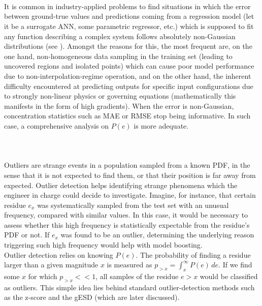 \paragraph{ \\}
It is common in industry-applied problems to find situations in which the error between ground-true values and predictions coming from a regression model (let it be a surrogate ANN, some parametric regressor, etc.) which is supposed to fit any function describing a complex system follows absolutely non-Gaussian distributions (see \eg \cite{chen2003non,pernot2020impact,smyl2021learning,chai2019using}). Amongst the reasons for this, the most frequent are, on the one hand, non-homogeneous data sampling in the training set (leading to uncovered regions and isolated points) which can cause poor model performance due to non-interpolation-regime operation, and on the other hand, the inherent difficulty encountered at predicting outputs for specific input configurations due to strongly non-linear physics or governing equations (mathematically this manifests in the form of high gradients). When the error is non-Gaussian, concentration statistics such as MAE or RMSE stop being informative. In such case, a comprehensive analysis on $P(e)$ is more adequate.\\
%
\paragraph{ \label{par:outliers}\\}
Outliers are strange events in a population sampled from a known PDF, in the sense that it is not expected to find them, or that their position is far away from expected. Outlier detection helps identifying strange phenomena which the engineer in charge could decide to investigate. Imagine, for instance, that certain residue $e_x$ was systematically sampled from the test set with an unusual frequency, compared with similar values. In this case, it would be necessary to assess whether this high frequency is statistically expectable from the residue's PDF or not. If $e_x$  was found to be an outlier, determining the underlying reason triggering such high frequency would help with model boosting.\\
\indent Outlier detection relies on knowing $P(e)$. The probability of finding a residue larger than a given magnitude $x$ is measured as $p_{>x}=\int_{x}^{\infty} P(e) \, de$. If we find some $x$ for which $p_{>x}<<1$, all samples of the residue $e>x$ would be classified as outliers. This simple idea lies behind standard outlier-detection methods such as the z-score and the gESD (which are later discussed).
